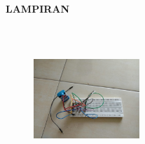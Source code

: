 \documentclass[12pt,a4paper]{article}
\begin{document}
\newpage
\begin{center}
\large{\textbf{LAMPIRAN}}
\end{center}

\newpage
\begin{figure}
\begin{center}\includegraphics[width=4cm, height=5.5cm]{g1.png}
\end{center}
\end{figure}
\vspace{2cm}
\end{document}
